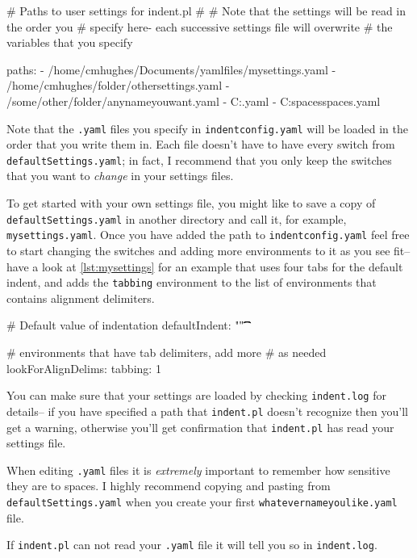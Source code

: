 \begin{yaml}[caption={\lstinline!indentconfig.yaml!},label={lst:indentconfig}]
# Paths to user settings for indent.pl
#
# Note that the settings will be read in the order you 
# specify here- each successive settings file will overwrite
# the variables that you specify

paths:
- /home/cmhughes/Documents/yamlfiles/mysettings.yaml
- /home/cmhughes/folder/othersettings.yaml
- /some/other/folder/anynameyouwant.yaml
- C:\Users\chughes\Documents\mysettings.yaml
- C:\Users\chughes\Desktop\test spaces\more spaces.yaml
\end{yaml}
 	 	 	 	 	
Note that the \lstinline!.yaml! files you specify in \lstinline!indentconfig.yaml!
will be loaded in the order that you write them in. Each file doesn't have 
to have every switch from \lstinline!defaultSettings.yaml!; in fact, I recommend 
that you only keep the switches that you want to \emph{change} in your 
settings files.
 	 	 	 	 	
To get started with your own settings file, you might like to save a copy of 
\lstinline!defaultSettings.yaml! in another directory and call it, for 
example, \lstinline!mysettings.yaml!. Once you have added the path to \lstinline!indentconfig.yaml!
feel free to start changing the switches and adding more environments to it 
as you see fit-- have a look at \cref{lst:mysettings} for an example 
that uses four tabs for the default indent, and adds the \lstinline!tabbing!
environment to the list of environments that contains alignment delimiters.
 	 	 	 	 	
\begin{yaml}[caption={\lstinline!mysettings.yaml! (example)},label={lst:mysettings}]
# Default value of indentation
defaultIndent: "\t\t\t\t"

# environments that have tab delimiters, add more 
# as needed
lookForAlignDelims:
   tabbing: 1
\end{yaml}
 	 	 	 	 	
You can make sure that your settings are loaded by checking \lstinline!indent.log!
for details-- if you have specified a path that \lstinline!indent.pl! doesn't 
recognize then you'll get a warning, otherwise you'll get confirmation that 
\lstinline!indent.pl! has read your settings file.
 	 	 	 	 	
 	 	 	 	 	
\begin{warning}
	When editing \lstinline!.yaml! files it is \emph{extremely} important 
	to remember how sensitive they are to spaces. I highly recommend copying 
	and pasting from \lstinline!defaultSettings.yaml! when you create your
	first \lstinline!whatevernameyoulike.yaml! file.
				
	If \lstinline!indent.pl! can not read your \lstinline!.yaml! file it 
	will tell you so in \lstinline!indent.log!.
\end{warning}
 	 	 	 	 	

